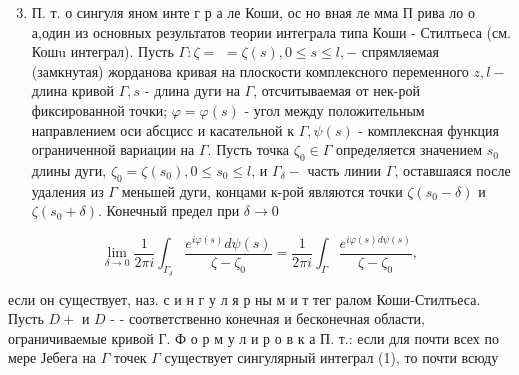 \documentclass[10pt]{article}
\begin{document}
\begin{enumerate}

  \setcounter{enumi}{2}

  \item П. т. о сингуля яном инте г р а ле Коши, ос но вная ле мма П рива ло о а,один из основных результатов теории интеграла типа Коши - Стилтьеса (см. Кошu интеграл). Пусть $\Gamma: \zeta=$ $=\zeta(s), 0 \leqslant s \leqslant l,-$ спрямляемая (замкнутая) жорданова кривая на плоскости комплексного переменного $z, l-$ длина кривой $\Gamma, s$ - длина дуги на $\Gamma$, отсчитываемая от нек-рой фиксированной точки; $\varphi=\varphi(s)$ - угол между положительным направлением оси абсцисс и касательной к $\Gamma, \psi(s)$ - комплексная функция ограниченной вариации на $\Gamma$. Пусть точка $\zeta_{0} \in \Gamma$ определяется значением $s_{0}$ длины дуги, $\zeta_{0}=\zeta\left(s_{0}\right), 0 \leqslant s_{0} \leqslant l$, и $\Gamma_{\delta}-$ часть линии $\Gamma$, оставшаяся после удаления из $\Gamma$ меньшей дуги, концами к-рой являются точки $\zeta\left(s_{0}-\delta\right)$ и $\zeta\left(s_{0}+\delta\right)$. Конечный предел при $\delta \rightarrow 0$

\end{enumerate}



\[

\lim _{\delta \rightarrow 0} \frac{1}{2 \pi i} \int_{\Gamma_{\delta}} \frac{e^{i \varphi(s)} d \psi(s)}{\zeta-\zeta_{0}}=\frac{1}{2 \pi i} \int_{\Gamma} \frac{e^{i \varphi(s) d \psi(s)}}{\zeta-\zeta_{0}},

\]



если он существует, наз. с и н г у л я р ны м и т тег ралом Коши-Стилтьеса. Пусть $D+$ и $D$ - - соответственно конечная и бесконечная области, ограничиваемые кривой $Г$. Ф о р м у л и р о в к а П. т.: если для почти всех по мере Јебега на $\Gamma$ точек $\Gamma$ существует сингулярный интеграл (1), то почти всюду
\end{document}
